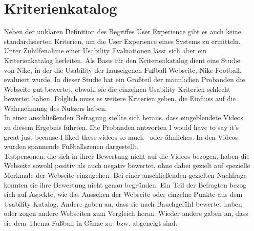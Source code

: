 \section{Kriterienkatalog} 
\label{Abschnitt:Kriterienkatalog}
Neben der unklaren Definition des Begriffes User Experience gibt es auch keine standardisierten Kriterien, um die User Experience eines Systems zu ermitteln. Unter Zuhilfenahme einer Usability Evaluationen lässt sich aber ein Kriterienkatalog herleiten. Als Basis für den Kriterienkatalog dient eine Studie von Nike, in der die Usability der hauseigenen Fußball Webseite, Nike-Football, evaluiert wurde. In dieser Studie hat ein Großteil der männlichen Probanden die Webseite gut bewertet, obwohl sie die einzelnen Usability Kriterien schlecht bewertet haben. Folglich muss es weitere Kriterien geben, die Einfluss auf die Wahrnehmung des Nutzers haben. \cite[S. 69f.]{Hartmann:2006vx}\\
In einer anschließenden Befragung stellte sich heraus, dass eingeblendete Videos zu diesem Ergebnis führten. Die Probanden antworten \glqq I would have to say it’s great just because I liked these videos so much\grqq\ \cite[S. 71]{Hartmann:2006vx} oder ähnliches. In den Videos wurden spannende Fußballszenen dargestellt.\\ 
Testpersonen, die sich in ihrer Bewertung nicht auf die Videos bezogen, haben die Webseite sowohl positiv als auch negativ bewertet, ohne dabei gezielt auf spezielle Merkmale der Webseite einzugehen. Bei einer anschließenden gezielten Nachfrage konnten sie ihre Bewertung nicht genau begründen. Ein Teil der Befragten bezog sich auf Aspekte, wie das Aussehen der Webseite oder einzelne Punkte aus dem Usability Katalog. Andere gaben an, dass sie nach Bauchgefühl bewertet haben oder zogen andere Webseiten zum Vergleich heran. Wieder andere gaben an, dass sie dem Thema Fußball in Gänze zu- bzw. abgeneigt sind. \cite[S. 71]{Hartmann:2006vx}\\
